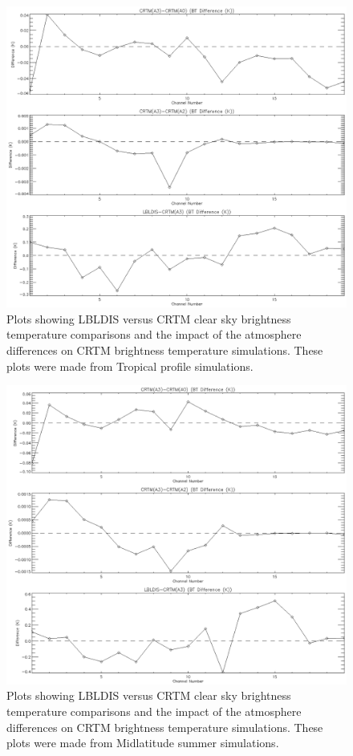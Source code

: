 \begin{figure}[htp]
  \centering{}
  \includegraphics[scale=0.8]{./graphics/BT_Differences_08.eps}
  \caption{Plots showing LBLDIS versus CRTM clear sky brightness temperature comparisons and the
  impact of the atmosphere differences on CRTM brightness temperature simulations. These plots were 
  made from Tropical profile simulations.}
  \label{fig:BT_Differences_Tropical}
\end{figure}

\begin{figure}[htp]
  \centering{}
  \includegraphics[scale=0.8]{./graphics/BT_Differences_01.eps}
  \caption{Plots showing LBLDIS versus CRTM clear sky brightness temperature comparisons and the
  impact of the atmosphere differences on CRTM brightness temperature simulations. These plots were 
  made from Midlatitude summer simulations.}
  \label{fig:BT_Differences_Midlatitude_summer}
\end{figure}

